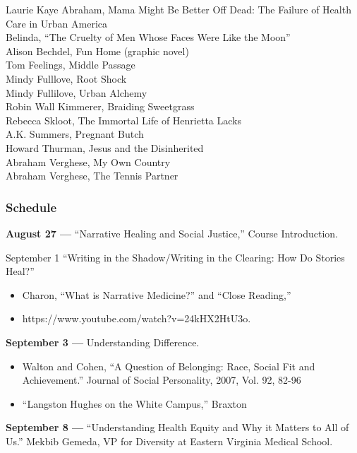 \documentclass[12pt]{article}
\providecommand{\tightlist}{%
  \setlength{\itemsep}{0pt}\setlength{\parskip}{0pt}}
\begin{document}
Laurie Kaye Abraham, Mama Might Be Better Off Dead: The Failure of
Health Care in Urban America\\
Belinda, ``The Cruelty of Men Whose Faces Were Like the Moon''\\
Alison Bechdel, Fun Home (graphic novel)\\
Tom Feelings, Middle Passage\\
Mindy Fulllove, Root Shock\\
Mindy Fullilove, Urban Alchemy\\
Robin Wall Kimmerer, Braiding Sweetgrass\\
Rebecca Skloot, The Immortal Life of Henrietta Lacks\\
A.K. Summers, Pregnant Butch\\
Howard Thurman, Jesus and the Disinherited\\
Abraham Verghese, My Own Country\\
Abraham Verghese, The Tennis Partner

\subsubsection{Schedule}\label{schedule}

\textbf{August 27 ---} ``Narrative Healing and Social Justice,'' Course
Introduction.

September 1 ``Writing in the Shadow/Writing in the Clearing: How Do
Stories Heal?''

\begin{itemize}
\tightlist
\item
  Charon, ``What is Narrative Medicine?'' and ``Close Reading,''
\item
  https://www.youtube.com/watch?v=24kHX2HtU3o.
\end{itemize}

\textbf{September 3 ---} Understanding Difference.

\begin{itemize}
\tightlist
\item
  Walton and Cohen, ``A Question of Belonging: Race, Social Fit and
  Achievement.'' Journal of Social Personality, 2007, Vol. 92, 82-96
\item
  ``Langston Hughes on the White Campus,'' Braxton
\end{itemize}

\textbf{September 8 ---} ``Understanding Health Equity and Why it
Matters to All of Us.'' Mekbib Gemeda, VP for Diversity at Eastern
Virginia Medical School.
\end{document}
